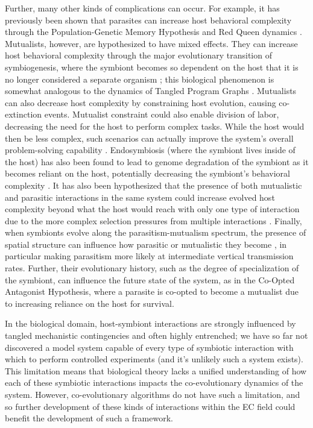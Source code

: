 Further, many other kinds of complications can occur.
For example, it has previously been shown that parasites can increase host behavioral complexity through the Population-Genetic Memory Hypothesis and Red Queen dynamics \citep{ladle1992parasites,zaman2014coevolution}.
Mutualists, however, are hypothesized to have mixed effects.
They can increase host behavioral complexity through the major evolutionary transition of symbiogenesis, where the symbiont becomes so dependent on the host that it is no longer considered a separate organism \citep{cavaliersmith2013symbiogenesis}; this biological phenomenon is somewhat analogous to the dynamics of Tangled Program Graphs \citep{smith2021evolving}.
Mutualists can also decrease host complexity by constraining host evolution, causing co-extinction events.
Mutualist constraint could also enable division of labor, decreasing the need for the host to perform complex tasks.
While the host would then be less complex, such scenarios can actually improve the system's overall problem-solving capability \citep{uchiumi2020evolution}.
Endosymbiosis (where the symbiont lives inside of the host) has also been found to lead to genome degradation of the symbiont as it becomes reliant on the host, potentially decreasing the symbiont's behavioral complexity \citep{andersson1999insights}.
It has also been hypothesized that the presence of both mutualistic and parasitic interactions in the same system could increase evolved host complexity beyond what the host would reach with only one type of interaction due to the more complex selection pressures from multiple interactions \citep{willkens2022evolving}.
Finally, when symbionts evolve along the parasitism-mutualism spectrum, the presence of spatial structure can influence how parasitic or mutualistic they become \citep{vostinar2019spatial}, in particular making parasitism more likely at intermediate vertical transmission rates.
Further, their evolutionary history, such as the degree of specialization of the symbiont, can influence the future state of the system, as in the Co-Opted Antagonist Hypothesis, where a parasite is co-opted to become a mutualist due to increasing reliance on the host for survival\citep{johnson2021coevolutionary}.

In the biological domain, host-symbiont interactions are strongly influenced by tangled mechanistic contingencies and often highly entrenched; we have so far not discovered a model system capable of every type of symbiotic interaction with which to perform controlled experiments (and it's unlikely such a system exists).
This limitation means that biological theory lacks a unified understanding of how each of these symbiotic interactions impacts the co-evolutionary dynamics of the system.
However, co-evolutionary algorithms do not have such a limitation, and so further development of these kinds of interactions within the EC field could benefit the development of such a framework.

